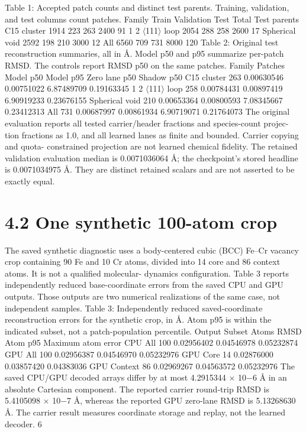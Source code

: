\documentclass[11pt]{article}
\begin{document}
Table 1: Accepted patch counts and distinct test parents. Training, validation, and test columns
count patches.
Family Train Validation Test Total Test parents
C15 cluster 1914 223 263 2400 91
1
2 \ensuremath{\langle}111\ensuremath{\rangle} loop 2054 288 258 2600 17
Spherical void 2592 198 210 3000 12
All 6560 709 731 8000 120
Table 2: Original test reconstruction summaries, all in Å. Model p50 and p95 summarize per-patch
RMSD. The controls report RMSD p50 on the same patches.
Family Patches Model p50 Model p95 Zero lane p50 Shadow p50
C15 cluster 263 0.00630546 0.00751022 6.87489709 0.19163345
1
2 \ensuremath{\langle}111\ensuremath{\rangle} loop 258 0.00784431 0.00897419 6.90919233 0.23676155
Spherical void 210 0.00653364 0.00800593 7.08345667 0.23412313
All 731 0.00687997 0.00861934 6.90719071 0.21764073
The original evaluation reports all tested carrier/header fractions and species-count projec-
tion fractions as 1.0, and all learned lanes as finite and bounded. Carrier copying and quota-
constrained projection are not learned chemical fidelity. The retained validation evaluation median
is 0.0071036064 Å; the checkpoint’s stored headline is 0.0071034975 Å. They are distinct retained
scalars and are not asserted to be exactly equal.

\section*{4.2 One synthetic 100-atom crop}

The saved synthetic diagnostic uses a body-centered cubic (BCC) Fe–Cr vacancy crop containing
90 Fe and 10 Cr atoms, divided into 14 core and 86 context atoms. It is not a qualified molecular-
dynamics configuration. Table 3 reports independently reduced base-coordinate errors from the
saved CPU and GPU outputs. Those outputs are two numerical realizations of the same case, not
independent samples.
Table 3: Independently reduced saved-coordinate reconstruction errors for the synthetic crop, in
Å. Atom p95 is within the indicated subset, not a patch-population percentile.
Output Subset Atoms RMSD Atom p95 Maximum atom error
CPU All 100 0.02956402 0.04546978 0.05232874
GPU All 100 0.02956387 0.04546970 0.05232976
GPU Core 14 0.02876000 0.03857420 0.04383036
GPU Context 86 0.02969267 0.04563572 0.05232976
The saved CPU/GPU decoded arrays differ by at most 4.2915344 \ensuremath{\times} 10\ensuremath{-}6 Å in an absolute
Cartesian component. The reported carrier round-trip RMSD is 5.4105098 \ensuremath{\times} 10\ensuremath{-}7 Å, whereas the
reported GPU zero-lane RMSD is 5.13268630 Å. The carrier result measures coordinate storage
and replay, not the learned decoder.
6
\end{document}
